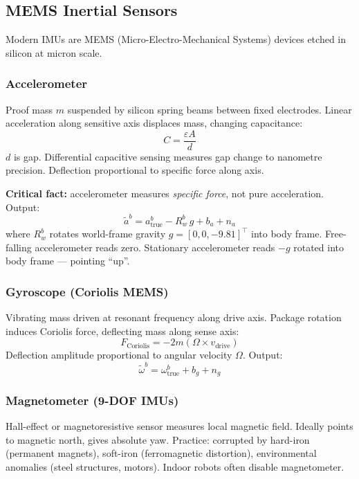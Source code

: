 \documentclass[11pt,a4paper]{article}
\begin{document}
\subsection{MEMS Inertial Sensors}

Modern IMUs are MEMS (Micro-Electro-Mechanical Systems) devices etched in silicon at micron scale.

\subsubsection{Accelerometer}

Proof mass $m$ suspended by silicon spring beams between fixed electrodes. Linear acceleration along sensitive axis displaces mass, changing capacitance:
\[
C = \frac{\varepsilon A}{d}
\]
$d$ is gap. Differential capacitive sensing measures gap change to nanometre precision. Deflection proportional to specific force along axis.

\textbf{Critical fact:} accelerometer measures \emph{specific force}, not pure acceleration. Output:
\begin{equation}
\boxed{\;\tilde{a}^b = a^b_{\text{true}} - R^b_w\, g + b_a + n_a\;}
\end{equation}
where $R^b_w$ rotates world-frame gravity $g = [0,0,-9.81]^\top$ into body frame. Free-falling accelerometer reads zero. Stationary accelerometer reads $-g$ rotated into body frame --- pointing ``up''.

\subsubsection{Gyroscope (Coriolis MEMS)}

Vibrating mass driven at resonant frequency along drive axis. Package rotation induces Coriolis force, deflecting mass along sense axis:
\[
F_{\text{Coriolis}} = -2m(\Omega \times v_{\text{drive}})
\]
Deflection amplitude proportional to angular velocity $\Omega$. Output:
\begin{equation}
\boxed{\;\tilde{\omega}^b = \omega^b_{\text{true}} + b_g + n_g\;}
\end{equation}

\subsubsection{Magnetometer (9-DOF IMUs)}

Hall-effect or magnetoresistive sensor measures local magnetic field. Ideally points to magnetic north, gives absolute yaw. Practice: corrupted by hard-iron (permanent magnets), soft-iron (ferromagnetic distortion), environmental anomalies (steel structures, motors). Indoor robots often disable magnetometer.
\end{document}
